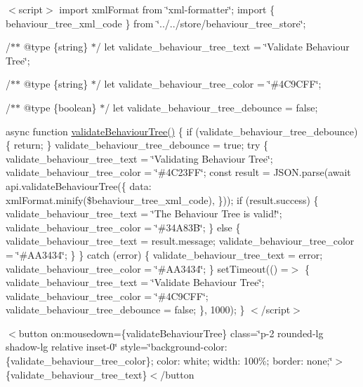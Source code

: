 $<$script$>$ import xml\+Format from \char`\"{}xml-\/formatter\char`\"{}; import \{ behaviour\+\_\+tree\+\_\+xml\+\_\+code \} from \char`\"{}../../store/behaviour\+\_\+tree\+\_\+store\char`\"{};

/$\ast$$\ast$ @type \{string\} $\ast$/ let validate\+\_\+behaviour\+\_\+tree\+\_\+text = \char`\"{}\+Validate Behaviour Tree\char`\"{};

/$\ast$$\ast$ @type \{string\} $\ast$/ let validate\+\_\+behaviour\+\_\+tree\+\_\+color = \char`\"{}\#4\+C9\+CFF\char`\"{};

/$\ast$$\ast$ @type \{boolean\} $\ast$/ let validate\+\_\+behaviour\+\_\+tree\+\_\+debounce = false;

async function \mbox{\hyperlink{behaviour__tree_8js_ae5f4d3481cf68db2c222cc1848971c14}{validate\+Behaviour\+Tree()}} \{ if (validate\+\_\+behaviour\+\_\+tree\+\_\+debounce) \{ return; \} validate\+\_\+behaviour\+\_\+tree\+\_\+debounce = true; try \{ validate\+\_\+behaviour\+\_\+tree\+\_\+text = \char`\"{}\+Validating Behaviour Tree\char`\"{}; validate\+\_\+behaviour\+\_\+tree\+\_\+color = \char`\"{}\#4\+C23\+FF\char`\"{}; const result = JSON.\+parse(await api.\+validate\+Behaviour\+Tree(\{ data\+: xml\+Format.\+minify(\$behaviour\+\_\+tree\+\_\+xml\+\_\+code), \})); if (result.\+success) \{ validate\+\_\+behaviour\+\_\+tree\+\_\+text = \char`\"{}\+The Behaviour Tree is valid!\char`\"{}; validate\+\_\+behaviour\+\_\+tree\+\_\+color = \char`\"{}\#34\+A83\+B\char`\"{}; \} else \{ validate\+\_\+behaviour\+\_\+tree\+\_\+text = result.\+message; validate\+\_\+behaviour\+\_\+tree\+\_\+color = \char`\"{}\#\+AA3434\char`\"{}; \} \} catch (error) \{ validate\+\_\+behaviour\+\_\+tree\+\_\+text = error; validate\+\_\+behaviour\+\_\+tree\+\_\+color = \char`\"{}\#\+AA3434\char`\"{}; \} set\+Timeout(() =\texorpdfstring{$>$}{>} \{ validate\+\_\+behaviour\+\_\+tree\+\_\+text = \char`\"{}\+Validate Behaviour Tree\char`\"{}; validate\+\_\+behaviour\+\_\+tree\+\_\+color = \char`\"{}\#4\+C9\+CFF\char`\"{}; validate\+\_\+behaviour\+\_\+tree\+\_\+debounce = false; \}, 1000); \} $<$/script$>$

$<$button     on\+:mousedown=\{validate\+Behaviour\+Tree\}     class=\char`\"{}p-\/2 rounded-\/lg shadow-\/lg relative inset-\/0\char`\"{}     style=\char`\"{}background-\/color\+: \{validate\+\_\+behaviour\+\_\+tree\+\_\+color\}; color\+: white; width\+: 100\%; border\+: none;\char`\"{}$>$\{validate\+\_\+behaviour\+\_\+tree\+\_\+text\}\texorpdfstring{$<$}{<}/button \begin{quote}
 \end{quote}
